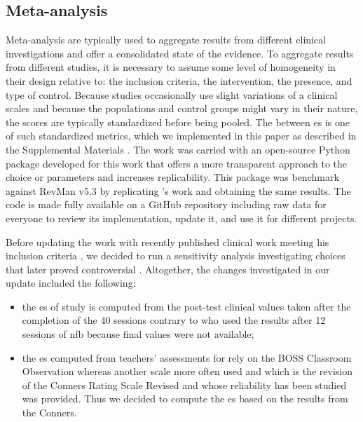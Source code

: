 \subsection{Meta-analysis}

Meta-analysis are typically used to aggregate results from different clinical investigations and offer a consolidated 
state of the evidence. To aggregate results from different studies, it is necessary to assume some level of homogeneity 
in their design relative to: the inclusion criteria, the intervention, the presence, and type of control.
Because studies occasionally use slight variations of a clinical scales and because the populations and 
control groups might vary in their nature, the scores are typically standardized before being pooled. 
The between \gls{es} is one of such standardized metrics, which we implemented in this paper as described 
in the Supplemental Materials \citep{add exact reference here}. The work was carried with an open-source 
Python package developed for this work that offers a more transparent approach to the choice or parameters 
and increases replicability. This package was benchmark against RevMan v5.3 \citep{RevMan}
by replicating \citet{Cortese2016}'s work and obtaining the same results. The code is made fully available 
on a GitHub repository \cite{add exact reference here} including raw data for everyone to review its implementation, update it, and 
use it for different projects. 
 
Before updating the \citet{Cortese2016} work with recently published clinical work meeting his inclusion criteria 
\citep{Strehl2017, Baumeister2016}, we decided to run a sensitivity analysis investigating choices that later 
proved controversial \citep{Micoulaud2016}. Altogether, the changes investigated in our update included the following:
\begin{itemize}
\item the \gls{es} of \citeauthor{Arnold2014} study is computed from the post-test clinical values taken after the completion of the 40 sessions 
contrary to \citet{Cortese2016} who used the results after 12 sessions of \gls{nfb} because final values were not available;
\item the \gls{es} computed from teachers' assessments for \citet{Steiner2014} rely on the BOSS Classroom Observation \citep{Shapiro2010} whereas 
another scale more often used \citep{Christiansen2014, Bluschke2016} and which is the revision of the Conners Rating Scale Revised \citep{Conners1998} 
and whose reliability has been studied \citep{Collett2003} was provided. Thus we decided to compute the \gls{es} based on the results from the Conners.  
\end{itemize} 

